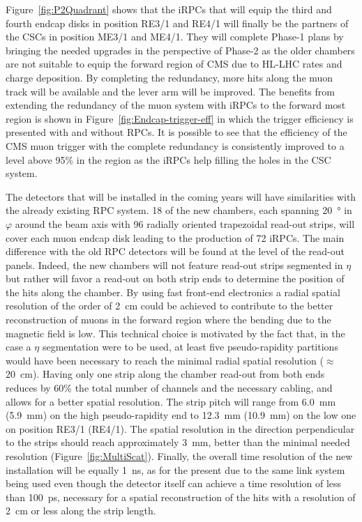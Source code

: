 	Figure~\ref{fig:P2Quadrant} shows that the iRPCs that will equip the third and fourth endcap disks in position RE3/1 and RE4/1 will finally be the partners of the CSCs in position ME3/1 and ME4/1. They will complete Phase-1 plans by bringing the needed upgrades in the perspective of Phase-2 as the older chambers are not suitable to equip the forward region of CMS due to HL-LHC rates and charge deposition. By completing the redundancy, more hits along the muon track will be available and the lever arm will be improved. The benefits from extending the redundancy of the muon system with iRPCs to the forward most region is shown in Figure~\ref{fig:Endcap-trigger-eff} in which the trigger efficiency is presented with and without RPCs. It is possible to see that the efficiency of the CMS muon trigger with the complete redundancy is consistently improved to a level above 95\% in the region  as the iRPCs help filling the holes in the CSC system.
	
	The detectors that will be installed in the coming years will have similarities with the already existing RPC system. 18 of the new chambers, each spanning \SI{20}{\degree} in $\varphi$ around the beam axis with 96 radially oriented trapezoidal read-out strips, will cover each muon endcap disk leading to the production of 72 iRPCs. The main difference with the old RPC detectors will be found at the level of the read-out panels. Indeed, the new chambers will not feature read-out strips segmented in $\eta$ but rather will favor a read-out on both strip ends to determine the position of the hits along the chamber. By using fast front-end electronics a radial spatial resolution of the order of \SI{2}{cm} could be achieved to contribute to the better reconstruction of muons in the forward region where the bending due to the magnetic field is low. This technical choice is motivated by the fact that, in the case a $\eta$ segmentation were to be used, at least five pseudo-rapidity partitions would have been necessary to reach the minimal radial spatial resolution ($\approx$ \SI{20}{cm}). Having only one strip along the chamber read-out from both ends reduces by 60\% the total number of channels and the necessary cabling, and allows for a better spatial resolution. The strip pitch will range from \SI{6.0}{mm} (\SI{5.9}{mm}) on the high pseudo-rapidity end to \SI{12.3}{mm} (\SI{10.9}{mm}) on the low one on position RE3/1 (RE4/1). The spatial resolution in the direction perpendicular to the strips should reach approximately \SI{3}{mm}, better than the minimal needed resolution (Figure~\ref{fig:MultiScat}). Finally, the overall time resolution of the new installation will be equally \SI{1}{ns}, as for the present due to the same link system being used even though the detector itself can achieve a time resolution of less than \SI{100}{ps}, necessary for a spatial reconstruction of the hits with a resolution of \SI{2}{cm} or less along the strip length.

